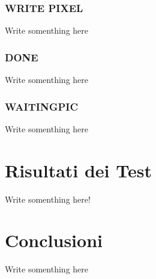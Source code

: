 \documentclass{article}
\begin{document}
\subsubsection{WRITE PIXEL}
Write somenthing here

\subsubsection{DONE}
Write somenthing here

\subsubsection{WAITINGPIC}
Write somenthing here

\section{Risultati dei Test}
Write somenthing here!

\section{Conclusioni}
Write somenthing here
\end{document}
